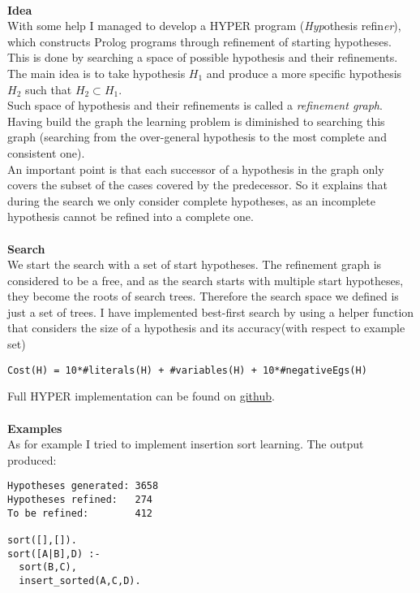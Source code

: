 \documentclass[11pt]{article}
\begin{document}
\paragraph{}
\textbf{Idea}\\
With some help I managed to develop a HYPER program (\emph{Hyp}othesis refin\emph{er}), which constructs Prolog programs through refinement of starting hypotheses. \\ This is done by searching a space of possible hypothesis and their refinements. The main idea is to take hypothesis \emph{$H_1$} and produce a more specific hypothesis \emph{$H_2$} such that $H_2 \subset H_1$.\\
Such space of hypothesis and their refinements is called a \emph{refinement graph}.\\Having build the graph the learning problem is diminished to searching this graph (searching from the over-general hypothesis to the most complete and consistent one).\\
An important point is that each successor of a hypothesis in the graph only covers the subset of the cases covered by the predecessor. So it explains that during the search we only consider complete hypotheses, as an incomplete hypothesis cannot be refined into a complete one.
\paragraph{}
\textbf{Search}\\
We start the search with a set of start hypotheses. The refinement graph is considered to be a free, and as the search starts with multiple start hypotheses, they become the roots of search trees. Therefore the search space we defined is just a set of trees. I have implemented best-first search by using a helper function that considers the size of a hypothesis and its accuracy(with respect to example set)
\begin{lstlisting}
Cost(H) = 10*#literals(H) + #variables(H) + 10*#negativeEgs(H)
\end{lstlisting} 
Full HYPER implementation can be found on \href{https://github.com/vitpro/ilp_alp_tal/blob/master/src/hyper.pl}{github}.

\paragraph{}
\textbf{Examples}\\
As for example I tried to implement insertion sort learning. The output produced:
\begin{lstlisting}
Hypotheses generated: 3658
Hypotheses refined:   274
To be refined:        412

sort([],[]).
sort([A|B],D) :-
  sort(B,C),
  insert_sorted(A,C,D).
  
\end{lstlisting} 
\end{document}
